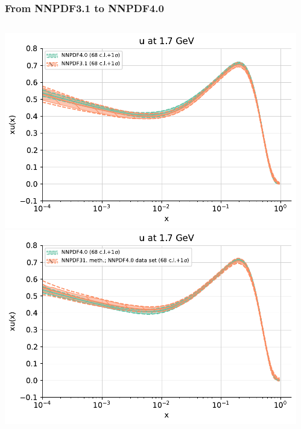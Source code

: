 \documentclass{beamer}
\begin{document}
\begin{frame}
 \frametitle{From NNPDF3.1 to NNPDF4.0}
 \footnotesize
 \centering
 \begin{columns}[c]
  \begin{column}{0.5\textwidth}
   \begin{overlayarea}{\columnwidth}{4cm}
    {
     \centering
     \includegraphics[width=\columnwidth]{plots/u_fit_1}\\    
    }
    {
     \centering
     \includegraphics[width=\columnwidth]{plots/u_fit_2}\\    
    }
   \end{overlayarea}
  \end{column}
  \begin{column}{0.5\textwidth}

\end{column}
\end{columns}
\end{frame}
\end{document}
